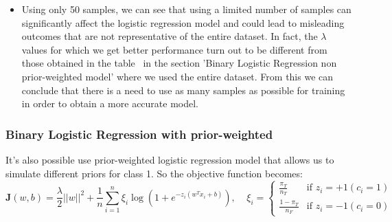 \documentclass{article}
\begin{document}
        \begin{itemize}
            \item Using only 50 samples, we can see that using a limited number of samples can significantly affect the logistic regression model and could lead to misleading outcomes that are not 
                representative of the entire dataset. 
                In fact, the \(\lambda\) values for which we get better performance turn out to be different from those obtained in the table~ in the section 'Binary Logistic Regression non prior-weighted model' where we used the entire dataset. From this we can conclude that there is a need to use as many samples as possible for training in order to obtain a more accurate model.
            \end{itemize}
\subsubsection*{Binary Logistic Regression with prior-weighted}
It's also possible use prior-weighted logistic regression model that allows us to simulate different priors for class 1. So the objective function becomes: 
\begin{equation}
    \mathbf{J}(w,b)=\frac{\lambda}{2} ||w||^2 + \frac{1}{n} \sum_{i=1}^{n} \xi_i\log({1+e^{-z_i(w^Tx_i+b)}}),\;\;\;\;
        \xi_i = 
        \begin{cases} 
          \frac{\pi_T}{n_T} & \text{if } z_i=+1 (c_i=1) \\
          \frac{1-\pi_T}{n_F} & \text{if } z_i=-1 (c_i=0)
        \end{cases}
\end{equation}
\end{document}
